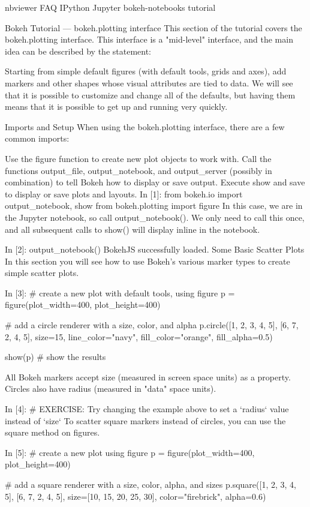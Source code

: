 nbviewer
FAQ
IPython
Jupyter
bokeh-notebooks   tutorial
 	
Bokeh Tutorial — bokeh.plotting interface
This section of the tutorial covers the bokeh.plotting interface. This interface is a "mid-level" interface, and the main idea can be described by the statement:

Starting from simple default figures (with default tools, grids and axes), add markers and other shapes whose visual attributes are tied to data.
We will see that it is possible to customize and change all of the defaults, but having them means that it is possible to get up and running very quickly.

Imports and Setup
When using the bokeh.plotting interface, there are a few common imports:

Use the figure function to create new plot objects to work with.
Call the functions output_file, output_notebook, and output_server (possibly in combination) to tell Bokeh how to display or save output.
Execute show and save to display or save plots and layouts.
In [1]:
from bokeh.io import output_notebook, show
from bokeh.plotting import figure
In this case, we are in the Jupyter notebook, so call output_notebook(). We only need to call this once, and all subsequent calls to show() will display inline in the notebook.

In [2]:
output_notebook()
BokehJS successfully loaded.
Some Basic Scatter Plots
In this section you will see how to use Bokeh's various marker types to create simple scatter plots.

In [3]:
# create a new plot with default tools, using figure
p = figure(plot_width=400, plot_height=400)

# add a circle renderer with a size, color, and alpha
p.circle([1, 2, 3, 4, 5], [6, 7, 2, 4, 5], size=15, line_color="navy", fill_color="orange", fill_alpha=0.5)

show(p) # show the results
	
All Bokeh markers accept size (measured in screen space units) as a property. Circles also have radius (measured in "data" space units).

In [4]:
# EXERCISE: Try changing the example above to set a `radius` value instead of `size`
To scatter square markers instead of circles, you can use the square method on figures.

In [5]:
# create a new plot using figure
p = figure(plot_width=400, plot_height=400)

# add a square renderer with a size, color, alpha, and sizes
p.square([1, 2, 3, 4, 5], [6, 7, 2, 4, 5], size=[10, 15, 20, 25, 30], color="firebrick", alpha=0.6)

